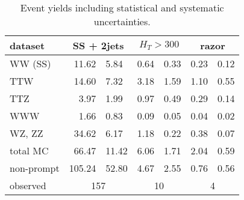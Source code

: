 \begin{table}
    \centering
    \begin{tabular}{l *3{r@{$\pm$}l}}
        \toprule
        dataset & \multicolumn{2}{c}{SS + 2jets}& \multicolumn{2}{c}{$H_T >
        300$}& \multicolumn{2}{c}{razor} \\
        \midrule
        WW (SS)& 11.62 & 5.84& 0.64 & 0.33& 0.23 & 0.12\\
        TTW& 14.60 & 7.32& 3.18 & 1.59& 1.10 & 0.55\\
        TTZ& 3.97 & 1.99& 0.97 & 0.49& 0.29 & 0.14\\
        WWW& 1.66 & 0.83& 0.09 & 0.05& 0.04 & 0.02\\
        WZ, ZZ& 34.62 & 6.17& 1.18 & 0.22& 0.38 & 0.07\\
        total MC& 66.47 & 11.42& 6.06 & 1.71& 2.04 & 0.59\\
        non-prompt & 105.24 & 52.80& 4.67 & 2.55& 0.76 & 0.56\\
        observed & \multicolumn{2}{c}{157}& \multicolumn{2}{c}{10}& \multicolumn{2}{c}{4} \\
        \bottomrule
    \end{tabular}
    \caption{Event yields including statistical and systematic uncertainties.}
\end{table}

